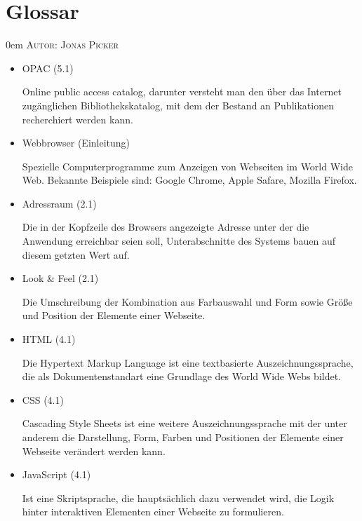 \documentclass{article}
\makeatletter
\newcommand{\sectionauthor}[1]{
	{\parindent 0em \large \scshape Autor: #1 \par \nobreak \vspace*{2em}}
	\@afterheading
}
\makeatother
\begin{document}
\section{Glossar} %
\sectionauthor{Jonas Picker}

\begin{itemize}\item OPAC (5.1)
\begin{flushleft}
Online public access catalog, darunter versteht man den über das Internet zugänglichen Bibliothekskatalog, mit dem der Bestand an Publikationen recherchiert werden kann.
\end{flushleft}
\item Webbrowser (Einleitung)
\begin{flushleft}
Spezielle Computerprogramme zum Anzeigen von Webseiten im World Wide Web. Bekannte Beispiele sind: Google Chrome, Apple Safare, Mozilla Firefox.
\end{flushleft}
\item Adressraum (2.1)
\begin{flushleft}
Die in der Kopfzeile des Browsers angezeigte Adresse unter der die Anwendung erreichbar seien soll, Unterabschnitte des Systems bauen auf diesem getzten Wert auf.
\end{flushleft}
\item Look \& Feel (2.1)
\begin{flushleft}
Die Umschreibung der Kombination aus Farbauswahl und Form sowie Größe und Position der Elemente einer Webseite.
\end{flushleft}
\item HTML (4.1)
\begin{flushleft}
Die Hypertext Markup Language ist eine textbasierte Auszeichnungssprache, die als Dokumentenstandart eine Grundlage des World Wide Webs bildet.
\end{flushleft}
\item CSS (4.1)
\begin{flushleft}
Cascading Style Sheets ist eine weitere Auszeichnungssprache mit der unter anderem die Darstellung, Form, Farben und Positionen der Elemente einer Webseite verändert werden kann.
\end{flushleft}
\item JavaScript (4.1)
\begin{flushleft}
Ist eine Skriptsprache, die hauptsächlich dazu verwendet wird, die Logik hinter interaktiven Elementen einer Webseite zu formulieren.

\end{flushleft}
\end{itemize}
\end{document}
